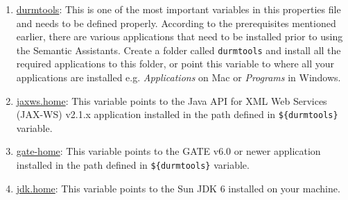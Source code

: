 \begin{enumerate}
\item \url{durmtools}: This is one of the most important variables in this properties file and needs to be defined properly. According to the prerequisites mentioned earlier, there are various applications that need to be installed prior to using the Semantic Assistants.
Create a folder called \texttt{durmtools} and install all the required applications to this folder, or point this variable to where all your applications are installed e.g. \emph{Applications} on Mac or \emph{Programs} in Windows.
\item \url{jaxws.home}: This variable points to the Java API for XML Web Services (JAX-WS) v2.1.x application installed in the path defined in \texttt{\$\{durmtools\}} variable.
\item \url{gate-home}: This variable points to the GATE v6.0 or newer application installed in the path defined in \texttt{\$\{durmtools\}} variable.
\item \url{jdk.home}: This variable points to the Sun JDK 6 installed on your machine.
\end{enumerate}


